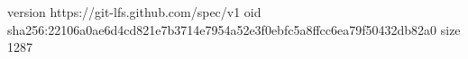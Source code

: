 version https://git-lfs.github.com/spec/v1
oid sha256:22106a0ae6d4cd821e7b3714e7954a52e3f0ebfc5a8ffcc6ea79f50432db82a0
size 1287

